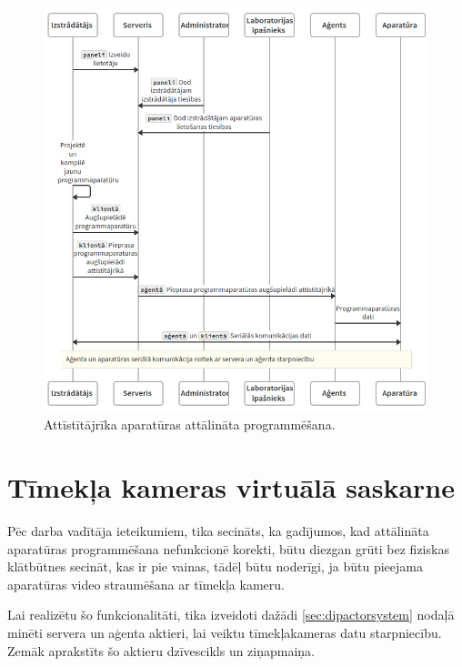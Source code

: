 \begin{figure}[H]
    \includegraphics[width=1.0\linewidth]{assets/agent.png}
    \centering
    \caption{Attīstītājrīka aparatūras attālināta programmēšana.}
    \label{fig:development}
\end{figure}

\section{Tīmekļa kameras virtuālā saskarne}
\label{sec:vinweb}

Pēc darba vadītāja ieteikumiem, tika secināts, ka gadījumos, kad attālināta
aparatūras programmēšana nefunkcionē korekti, būtu diezgan grūti bez fiziskas
klātbūtnes secināt, kas ir pie vainas, tādēļ būtu noderīgi, ja būtu pieejama
aparatūras video straumēšana ar tīmekļa kameru.

Lai realizētu šo funkcionalitāti, tika izveidoti dažādi \ref{sec:dipactorsystem}
nodaļā minēti servera un aģenta aktieri, lai veiktu tīmekļakameras datu
starpniecību. Zemāk aprakstīts šo aktieru dzīvescikls un ziņapmaiņa.

